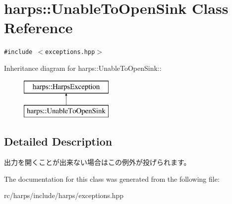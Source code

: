 \section{harps::UnableToOpenSink Class Reference}
\label{classharps_1_1UnableToOpenSink}
{\tt \#include $<$exceptions.hpp$>$}

Inheritance diagram for harps::UnableToOpenSink::\begin{figure}[H]
\begin{center}
\leavevmode
\includegraphics[height=2cm]{classharps_1_1UnableToOpenSink}
\end{center}
\end{figure}


\subsection{Detailed Description}
出力を開くことが出来ない場合はこの例外が投げられます。 

The documentation for this class was generated from the following file:\begin{CompactItemize}
\item 
rc/harps/include/harps/exceptions.hpp\end{CompactItemize}
